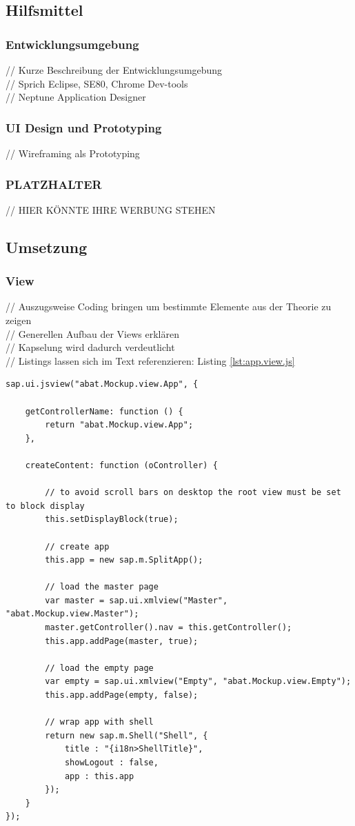 \documentclass[12pt,a4paper,bibliography=totocnumbered,listof=totocnumbered]{scrartcl}
\begin{document}
\subsection{Hilfsmittel}
\subsubsection{Entwicklungsumgebung}
// Kurze Beschreibung der Entwicklungsumgebung\\
// Sprich Eclipse, SE80, Chrome Dev-tools\\
// Neptune Application Designer\\

\subsubsection{UI Design und Prototyping}
// Wireframing als Prototyping\\

\subsubsection{PLATZHALTER}
// HIER KÖNNTE IHRE WERBUNG STEHEN \cite{NilsBlog2014}\\

\subsection{Umsetzung}
\subsubsection{View}
// Auszugsweise Coding bringen um bestimmte Elemente aus der Theorie zu zeigen\\
// Generellen Aufbau der Views erklären\\
// Kapselung wird dadurch verdeutlicht\\
// Listings lassen sich im Text referenzieren: Listing \ref{lst:app.view.js}
	\vspace{1em}
	\begin{lstlisting}[caption=Root View der Applikation, label=lst:app.view.js]
sap.ui.jsview("abat.Mockup.view.App", {

	getControllerName: function () {
		return "abat.Mockup.view.App";
	},
	
	createContent: function (oController) {
		
		// to avoid scroll bars on desktop the root view must be set to block display
		this.setDisplayBlock(true);
		
		// create app
		this.app = new sap.m.SplitApp();

		// load the master page
		var master = sap.ui.xmlview("Master", "abat.Mockup.view.Master");
		master.getController().nav = this.getController();
		this.app.addPage(master, true);
		
		// load the empty page
		var empty = sap.ui.xmlview("Empty", "abat.Mockup.view.Empty");
		this.app.addPage(empty, false);
		
		// wrap app with shell
		return new sap.m.Shell("Shell", {
			title : "{i18n>ShellTitle}",
			showLogout : false,
			app : this.app
		});
	}
});
	\end{lstlisting}
\end{document}

